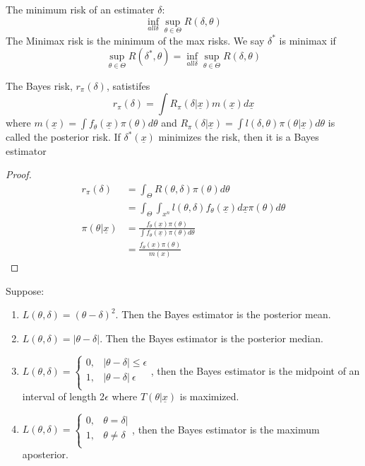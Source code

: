\documentclass[11pt,fleqn]{book} %
\begin{document}
\begin{definition}
	The minimum risk of an estimater $\delta$:
			$$\inf_{all \delta} \sup_{\theta \in \Theta} R(\delta, \theta) $$
	The Minimax risk is the minimum of the max risks. We say $\delta^*$ is minimax if
	$$\sup_{\theta \in \Theta} R(\delta^*, \theta) = \inf_{all \delta} \sup_{\theta \in \Theta} R(\delta, \theta)$$
	\end{definition}	

\begin{theorem}
	The Bayes risk, $r_\pi(\delta)$, satistifes 
	$$r_\pi(\delta) = \int R_\pi(\delta|\underline{x})m(\underline{x})d\underline{x}$$
	where $m(\underline{x}) = \int f_\theta(\underline{x}) \pi(\theta)d\theta$ and $R_\pi(\delta|\underline{x}) = \int l(\delta, \theta) \pi(\theta|\underline{x})d\theta$ is called the posterior risk. If $\delta^*(\underline{x})$ minimizes the risk, then it is a Bayes estimator 
\end{theorem}

\begin{proof}
\begin{align*}
	r_\pi(\delta) &= \int_\Theta R(\theta,\delta) \pi(\theta)d\theta\\
	&= \int_\Theta \int_{x^n} l(\theta,\delta) f_\theta(\underline{x})d\underline{x } \pi(\theta)d\theta\\
	\pi(\theta|\underline{x}) &= \frac{f_\theta (\underline{x})\pi(\theta)}{\int f_\theta (\underline{x}) \pi(\theta)d\theta}\\
	&= \frac{f_\theta(\underline{x})\pi(\theta)}{m(x)}
\end{align*}
	
\end{proof}

\begin{theorem}
	Suppose:
	\begin{enumerate}[label = \alph*)]
		\item $L(\theta, \delta) = (\theta - \delta)^2$. Then the Bayes estimator is the posterior mean.
		\item $L(\theta, \delta) = |\theta - \delta|$. Then the Bayes estimator is the posterior median.
		\item $L(\theta, \delta) = \begin{cases}
			0, & |\theta-\delta| \le \epsilon\\
			1, & |\theta-\delta| \> \epsilon\\
		\end{cases}$, then the Bayes estimator is the midpoint of an interval of length 2$\epsilon$ where $T(\theta|\underline{x})$ is maximized. 
		\item $L(\theta, \delta) = \begin{cases}
			0, & \theta=\delta|\\
			1, & \theta \neq \delta\\
		\end{cases}$, then the Bayes estimator is the maximum aposterior.
	\end{enumerate}
\end{theorem}
\end{document}
